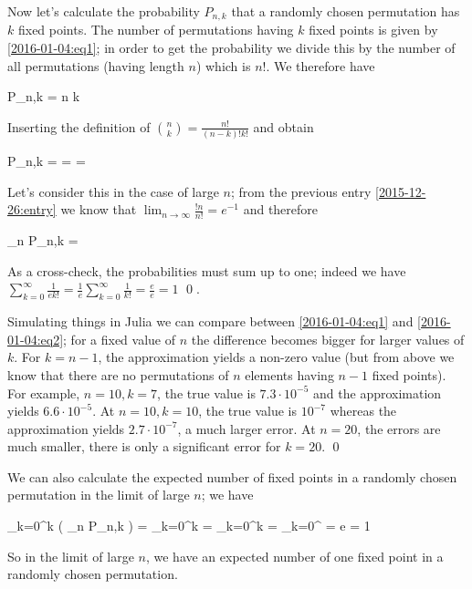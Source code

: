 Now let's calculate the probability $P_{n,k}$ that a randomly chosen permutation has $k$ fixed points. The number of permutations having $k$ fixed points is given by \eqref{2016-01-04:eq1}; in order to get the probability we divide this by the number of all permutations (having length $n$) which is $n!$. We therefore have

\bee
P_{n,k} = {n \choose k} 
\eee

Inserting the definition of ${n \choose k} = \frac{n!}{(n-k)! k!}$ and obtain

\be\label{2016-01-04:eq2}
P_{n,k} =   =  =  
\ee

Let's consider this in the case of large $n$; from the previous entry \ref{2015-12-26:entry} we know that $\lim_{n \rightarrow \infty} \frac{!n}{n!} = e^{-1}$ and therefore

\be\label{2016-01-04:eq2}
\lim_{n \rightarrow \infty} P_{n,k} = 
\ee

As a cross-check, the probabilities must sum up to one; indeed we have $\sum_{k=0}^\infty \frac{1}{e k!} = \frac{1}{e} \sum_{k=0}^\infty \frac{1}{k!} = \frac{e}{e} = 1$ \qed.

Simulating things in Julia we can compare between \eqref{2016-01-04:eq1} and \eqref{2016-01-04:eq2}; for a fixed value of $n$ the difference becomes bigger for larger values of $k$. For $k=n-1$, the approximation yields a non-zero value (but from above we know that there are no permutations of $n$ elements having $n-1$ fixed points). For example, $n = 10, k=7$, the true value is $7.3 \cdot 10^{-5}$ and the approximation yields $6.6 \cdot 10^{-5}$. At $n = 10, k=10$, the true value is $10^{-7}$ whereas the approximation yields $2.7 \cdot 10^{-7}$, a much larger error. At $n=20$, the errors are much smaller, there is only a significant error for $k=20$. \qed

We can also calculate the expected number of fixed points in a randomly chosen permutation in the limit of large $n$; we have

\bee
\sum_{k=0}^\infty k \left( \lim_{n \rightarrow \infty} P_{n,k} \right) = \sum_{k=0}^\infty k  =  \sum_{k=0}^\infty k  =  \sum_{k=0}^\infty {} =  e = 1
\eee

So in the limit of large $n$, we have an expected number of one fixed point in a randomly chosen permutation. 


